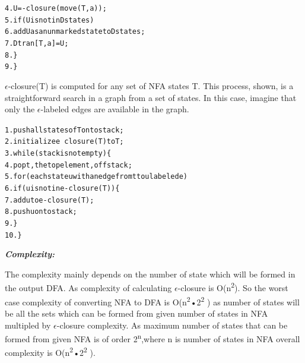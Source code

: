 \documentclass{article}
\begin{document}
\begin{answer}
\begin{alltt}
\hspace{1.5cm} 4. \hspace{2cm} U = \epsilon -closure(move(T,a));
\hspace{1.5cm} 5. \hspace{2cm} if ( U is not in Dstates )
\hspace{1.5cm} 6. \hspace{3cm} add U as an unmarked state to Dstates;
\hspace{1.5cm} 7.	\hspace{4cm}  Dtran[T, a] = U;
\hspace{1.5cm} 8. \hspace{2cm} \}
\hspace{1.5cm} 9. \}
\end{alltt}
\item $\epsilon$-closure(T) is computed for any set of NFA states T. This process, shown, is a straightforward
search in a graph from a set of states. In this case, imagine that only the $\epsilon$-labeled edges are
available in the graph.
\begin{alltt}
\hspace{1.5cm} 1. push all states of T onto stack;
\hspace{1.5cm} 2. initialize e~closure(T) to T;
\hspace{1.5cm} 3. while ( stack is not empty ) \{
\hspace{1.5cm} 4. 	\hspace{1cm} pop t, the top element, off stack;
\hspace{1.5cm} 5.	\hspace{2cm} for ( each state u with an edge from t to u labeled e )
\hspace{1.5cm} 6.	\hspace{3cm} if ( u is not in e-closure(T) ) \{
\hspace{1.5cm} 7.	\hspace{4cm} add u to e-closure(T);	
\hspace{1.5cm} 8.	\hspace{4cm} push u onto stack;
\hspace{1.5cm} 9.	\hspace{3cm} \}
\hspace{1.5cm} 10. \}
\end{alltt}
\item \textit{\textbf{Complexity:}}
\item The complexity mainly depends on the number of state which will be formed in the output
DFA. As complexity of calculating $\epsilon$-closure is O(n\textsuperscript{2}). So the worst case complexity of
converting NFA to DFA is O(n\textsuperscript{2}•2\textsuperscript{2} ) as number of states will be all the sets which can be
formed from given number of states in NFA multipled by $\epsilon$-closure complexity. As maximum
number of states that can be formed from given NFA is of order 2\textsuperscript{n},where n is number of states
in NFA overall complexity is O(n\textsuperscript{2}•2\textsuperscript{2} ).

\end{answer}
\medskip
\end{document}
